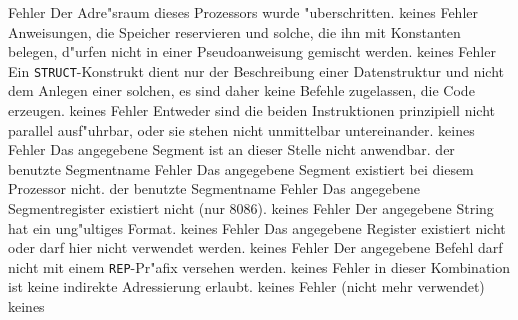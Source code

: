 \documentclass[12pt,a4paper,twoside]{report}
\newcommand{\tty}[1]{{\tt #1}}
\begin{document}
\begin{description}
               {Fehler}
               {Der Adre"sraum dieses Prozessors wurde
                "uberschritten.}
               {keines}
               {Fehler}
               {Anweisungen, die Speicher reservieren und solche,
                die ihn mit Konstanten belegen, d"urfen nicht in einer
                Pseudoanweisung gemischt werden.}
               {keines}
               {Fehler}
               {Ein \tty{STRUCT}-Konstrukt dient nur der Beschreibung
                einer Datenstruktur und nicht dem Anlegen einer solchen,
                es sind daher keine Befehle zugelassen, die Code erzeugen.}
               {keines}
               {Fehler}
               {Entweder sind die beiden Instruktionen
                prinzipiell nicht parallel ausf"uhrbar, oder sie stehen nicht
                unmittelbar untereinander.}
               {keines}
               {Fehler}
               {Das angegebene Segment ist an dieser Stelle
                nicht anwendbar.}
               {der benutzte Segmentname}
               {Fehler}
               {Das angegebene Segment existiert bei
                diesem Prozessor nicht.}
               {der benutzte Segmentname}
               {Fehler}
               {Das angegebene Segmentregister existiert
                nicht (nur 8086).}
               {keines}
               {Fehler}
               {Der angegebene String hat ein ung"ultiges
                Format.}
               {keines}
               {Fehler}
               {Das angegebene Register existiert nicht oder
                darf hier nicht verwendet werden.}
               {keines}
               {Fehler}
               {Der angegebene Befehl darf nicht mit einem
                \tty{REP}-Pr"afix versehen werden.}
               {keines}
               {Fehler}
               {in dieser Kombination ist keine indirekte
                Adressierung erlaubt.}
               {keines}
               {Fehler}
               {(nicht mehr verwendet)}
               {keines}

\end{description}
\end{document}
